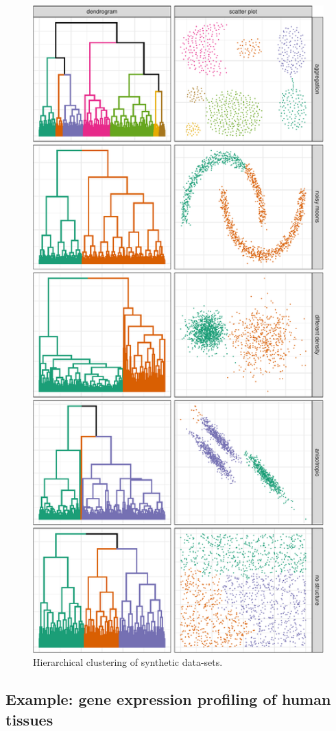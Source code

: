 \documentclass[]{book}
\theoremstyle{definition}
\theoremstyle{definition}
\theoremstyle{definition}
\theoremstyle{remark}
\begin{document}
\begin{figure}

{\centering \includegraphics[width=0.75\linewidth]{09-clustering_files/figure-latex/hclustToyData-1} 

}

\caption{Hierarchical clustering of synthetic data-sets. }\label{fig:hclustToyData}
\end{figure}

\subsection{Example: gene expression profiling of human
tissues}\label{example-gene-expression-profiling-of-human-tissues}
\end{document}
